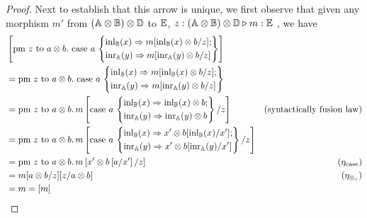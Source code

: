\documentclass[10pt,a4paper]{amsart}
\theoremstyle{definition}
\theoremstyle{definition}
\theoremstyle{definition}
\theoremstyle{definition}
\theoremstyle{definition}
\theoremstyle{definition}
\begin{document}
\begin{proof}
  Next to establish that this arrow is unique, we first observe that given any morphism $m'$ from $(\mathbb{A} \otimes \mathbb{B}) \otimes \mathbb{D} $ to $\mathbb{E}$, $z: (\mathbb{A} \otimes \mathbb{B}) \otimes \mathbb{D} \triangleright m : \mathbb{E} $ , we have
  \begin{align*}
   & \left[\text{pm } z \text{ to } a \otimes b. \text{ case } a\, \left\{ \begin{aligned}
      & \mathrm{inl}_{\mathbb{B}}(x) \Rightarrow m[\mathrm{inl}_{\mathbb{B}}(x) \otimes b/z];\\
      & \mathrm{inr}_{\mathbb{A}}(y) \Rightarrow m [\mathrm{inr}_{\mathbb{A}}(y) \otimes b/z]
    \end{aligned}
      \right\}
      \right] \\
    & =  \text{pm } z \text{ to } a \otimes b. \text{ case } a\, \left\{ \begin{aligned}
      & \mathrm{inl}_{\mathbb{B}}(x) \Rightarrow m[\mathrm{inl}_{\mathbb{B}}(x) \otimes b/z];\\
      & \mathrm{inr}_{\mathbb{A}}(y) \Rightarrow m [\mathrm{inr}_{\mathbb{A}}(y) \otimes b/z]
    \end{aligned}
      \right\} \\
    & =   \text{pm } z \text{ to } a \otimes b. \, m \left[\text{case } a\, \left\{ \begin{aligned}
      & \mathrm{inl}_{\mathbb{B}}(x) \Rightarrow \mathrm{inl}_{\mathbb{B}}(x) \otimes b;\\
      & \mathrm{inr}_{\mathbb{A}}(y) \Rightarrow \mathrm{inr}_{\mathbb{A}}(y) \otimes b
    \end{aligned}  \right\}/z \right] & (\text{syntactically fusion law}) \\
    & = \text{pm } z \text{ to } a \otimes b. \, m \left[\text{case } a\, \left\{ \begin{aligned}
      & \mathrm{inl}_{\mathbb{B}}(x) \Rightarrow x' \otimes b [\mathrm{inl}_{\mathbb{B}}(x)/x'];\\
      & \mathrm{inr}_{\mathbb{A}}(y) \Rightarrow  x' \otimes b [\mathrm{inr}_{\mathbb{A}}(y)/x']
    \end{aligned}  \right\}/z \right] &  \\
    & = \text{pm } z \text{ to } a \otimes b. \, m \left[ x' \otimes b \, [a/x'] \,/z \right] & (\eta_{\text{case}})  \\ 
    & = m[a \otimes b/z][z/a\otimes b] & (\eta_{\otimes_e}) \\
    & = m = [m]
  \end{align*}


\end{proof}
\end{document}
